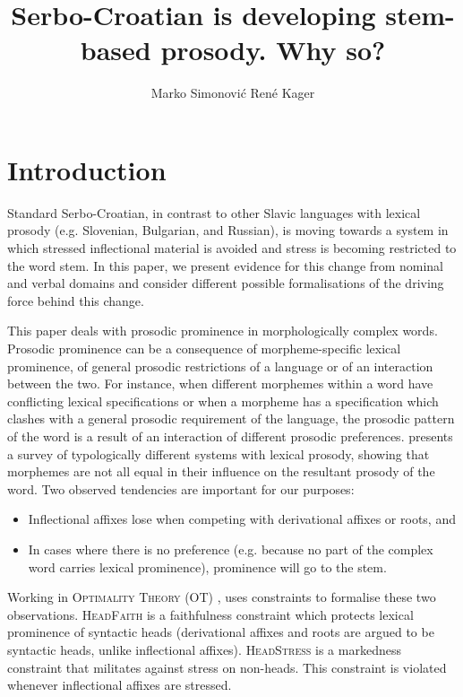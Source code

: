 \documentclass[output=paper,modfonts,nonflat
]{langsci/langscibook}
\title{Serbo-Croatian is developing stem-based prosody. Why so?}
\author{%
 Marko Simonović\affiliation{University of Nova Gorica}\orcid{0000-0002-9651-6399}\lastand 
 René Kager\affiliation{Utrecht University}\orcid{0000-0002-5811-839X}}
\begin{document}
\maketitle

\section{Introduction} \label{sec:kager:1}
\sloppy Standard Serbo-Croatian, in contrast to other Slavic languages with lexical prosody (e.g. Slovenian, Bulgarian, and Russian), is moving towards a system in which stressed inflectional material is avoided and stress is becoming restricted to the word stem. In this paper, we present evidence for this change from nominal and verbal domains and consider different possible formalisations of the driving force behind this change.

This paper deals with prosodic prominence in morphologically complex words. Prosodic prominence can be a consequence of morpheme-specific lexical prominence, of general prosodic restrictions of a language or of an interaction between the two. For instance, when different morphemes within a word have conflicting lexical specifications or when a morpheme has a specification which clashes with a general prosodic requirement of the language, the prosodic pattern of the word is a result of an interaction of different prosodic preferences. \citet{Revithiadou1999} presents a survey of typologically different systems with lexical prosody, showing that morphemes are not all equal in their influence on the resultant prosody of the word. Two observed tendencies are important for our purposes:

\begin{itemize}
\item Inflectional affixes lose when competing with derivational affixes or roots, and
\item In cases where there is no preference (e.g. because no part of the complex word carries lexical prominence), prominence will go to the stem.
\end{itemize}

\noindent Working in \textsc{Optimality Theory} (OT) \citep[]{Prince1993}, \citet{Revithiadou1999} uses constraints to formalise these two observations. \textsc{HeadFaith} is a faithfulness constraint which protects lexical prominence of syntactic heads (derivational affixes and roots are argued to be syntactic heads, unlike inflectional affixes). \textsc{HeadStress} is a markedness constraint that militates against stress on non-heads. This constraint is violated whenever inflectional affixes are stressed.
\end{document}
